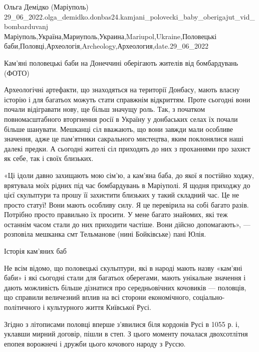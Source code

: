 
 
 
 
 

Ольга Демідко (Маріуполь)
29_06_2022.olga_demidko.donbas24.kamjani_polovecki_baby_oberigajut_vid_bombarduvanj
Маріуполь,Україна,Мариуполь,Украина,Mariupol,Ukraine,Половецькі баби,Половці,Археологія,Archeology,Археология,date.29_06_2022

Кам'яні половецькі баби на Донеччині оберігають жителів від бомбардувань (ФОТО)

Археологічні артефакти, що знаходяться на території Донбасу, мають власну
історію і для багатьох можуть стати справжнім відкриттям. Проте сьогодні вони
почали відігравати нову, ще більш значущу роль. Так, з початком
повномасштабного вторгнення росії в Україну у донбаських селах їх почали більше
шанувати. Мешканці сіл вважають, що вони завжди мали особливе значення, адже це
пам'ятники сакрального мистецтва, яким поклонялися наші далекі предки. А
сьогодні жителі сіл приходять до них з проханнями про захист як себе, так і
своїх близьких.

«Ці ідоли давно захищають мою сім'ю, а кам'яна баба, до якої я постійно ходжу,
врятувала моїх рідних під час бомбардувань в Маріуполі. Я щодня приходжу до
цієї скульптури та прошу її захистити близьких у такий складний час. Це не
просто статуї! Вони мають особливу силу. Я це перевірила на собі багато разів.
Потрібно просто правильно їх просити. У мене багато знайомих, які теж останнім
часом стали до них приходити частіше. Вони дійсно допомагають», — розповіла
мешканка смт Тельманове (нині Бойківське) пані Юлія.

Історія кам'яних баб

Не всім відомо, що половецькі скульптури, які в народі мають назву «кам'яні
баби» і які сьогодні стали для багатьох оберегами, мають унікальне значення і
дають можливість більше дізнатися про середньовічних кочовиків — половців, що
справили величезний вплив на всі сторони економічного, соціально-політичного і
культурного життя Київської Русі.

Згідно з літописами половці вперше з'явилися біля кордонів Русі в 1055 р. і,
уклавши мирний договір, пішли в степ. З цього моменту почалася двохсотлітня
епопея ворожнечі і дружби цього кочового народу з Руссю.

